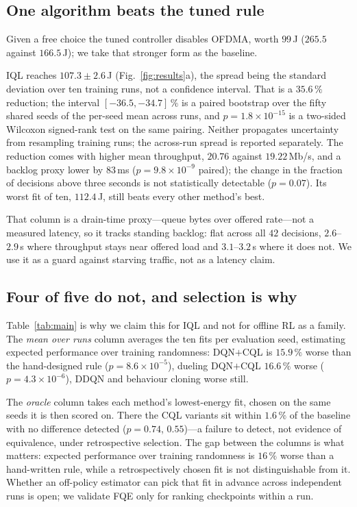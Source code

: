 \subsection{One algorithm beats the tuned rule}

Given a free choice the tuned controller disables OFDMA, worth $99$\,J
($265.5$ against $166.5$\,J); we take that stronger form as the baseline.


IQL reaches $107.3 \pm 2.6$\,J (Fig.~\ref{fig:results}a), the spread being the
standard deviation over ten training runs, not a confidence interval. That is a $35.6\,\%$ reduction;
the interval $[-36.5,-34.7]\,\%$ is a paired bootstrap over the fifty shared
seeds of the per-seed mean across runs, and $p = 1.8\times10^{-15}$ is a
two-sided Wilcoxon signed-rank test on the same pairing. Neither propagates
uncertainty from resampling training runs; the across-run spread is reported
separately. The reduction comes with higher
mean throughput, $20.76$ against $19.22$\,Mb/s, and a backlog proxy lower by
$83$\,ms ($p = 9.8\times10^{-9}$ paired); the change in the fraction of
decisions above three seconds is not statistically detectable ($p = 0.07$). Its worst fit of ten,
$112.4$\,J, still beats every other method's best.

That column is a drain-time proxy---queue bytes over offered rate---not a
measured latency, so it tracks standing backlog: flat across all $42$ decisions,
$2.6$--$2.9$\,s where throughput stays near offered load and $3.1$--$3.2$\,s
where it does not. We use it as a guard against starving traffic, not as a
latency claim.

\subsection{Four of five do not, and selection is why}

Table~\ref{tab:main} is why we claim this for IQL and not for offline RL as a
family. The \emph{mean over runs} column averages the ten fits per evaluation
seed, estimating expected performance over training randomness: DQN$+$CQL is
$15.9\,\%$ worse than the hand-designed rule ($p = 8.6\times10^{-5}$),
dueling DQN$+$CQL $16.6\,\%$ worse ($p = 4.3\times10^{-6}$), DDQN and
behaviour cloning worse still.

The \emph{oracle} column takes each method's lowest-energy fit, chosen on the
same seeds it is then scored on. There the CQL variants sit within $1.6\,\%$ of
the baseline with no difference detected ($p = 0.74$, $0.55$)---a failure to
detect, not evidence of equivalence, under retrospective selection. The gap
between the columns is what matters: expected performance over training
randomness is $16\,\%$ worse than a hand-written rule, while a retrospectively
chosen fit is not distinguishable from it. Whether an off-policy estimator can
pick that fit in advance across independent runs is open; we validate FQE only
for ranking checkpoints within a run.

